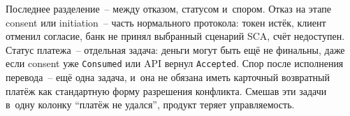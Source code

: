 Последнее разделение~-- между отказом, статусом и~спором. Отказ
на этапе consent или initiation~-- часть нормального протокола:
токен истёк, клиент отменил согласие, банк не принял выбранный
сценарий SCA, счёт недоступен. Статус платежа~-- отдельная задача:
деньги могут быть ещё не финальны, даже если consent уже
\texttt{Consumed} или API вернул \texttt{Accepted}. Спор после
исполнения перевода~-- ещё одна задача, и~она не обязана иметь
карточный возвратный платёж как стандартную форму разрешения конфликта.
Смешав эти задачи в~одну колонку \enquote{платёж не удался},
продукт теряет управляемость.


